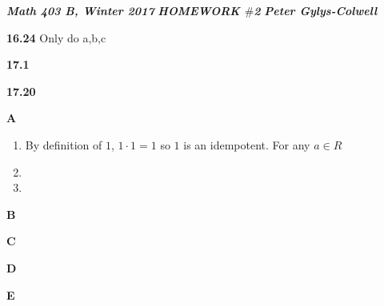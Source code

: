 \documentclass[12pt]{article}
\newenvironment{ques}{\vspace{2 ex}}{\vspace{2 ex}}
\theoremstyle{definition}
\begin{document}
\noindent \textit{\textbf{Math 403 B, Winter 2017}} \hspace{1.3cm}
\textit{\textbf{HOMEWORK $\#$2}} \hspace{1.3cm} \textit{\textbf{Peter
Gylys-Colwell}} 

\vspace{1cm}

\begin{ques}
	\textbf{16.24} Only do a,b,c
\end{ques}

\begin{ques}
	\textbf{17.1}
\end{ques}

\begin{ques}
	\textbf{17.20}
\end{ques}

\begin{ques}
	\textbf{A}
	\begin{enumerate}
		\item
		By definition of $1$, $1 \cdot 1 = 1$ so $1$ is an idempotent.
		For any $a \in R$
		\item

		\item


	\end{enumerate}
\end{ques}

\begin{ques}
	\textbf{B}
\end{ques}

\begin{ques}
	\textbf{C}
\end{ques}

\begin{ques}
	\textbf{D}
\end{ques}

\begin{ques}
	\textbf{E}
\end{ques}
\end{document}
